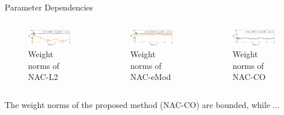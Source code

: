 \documentclass[8pt, aspectratio=169]{beamer}
\begin{document}
\begin{frame}{Parameter Dependencies}

  \begin{columns}

      \begin{figure}      
        \includegraphics[width=0.99\textwidth]{figures/ECC/fig9.eps}
        \caption{Weight norms of NAC-L2}
      \end{figure}
      

      \begin{figure}
        \includegraphics[width=0.99\textwidth]{figures/ECC/fig10.eps}
        \caption{Weight norms of NAC-eMod}
      \end{figure}


      \begin{figure}
        \includegraphics[width=0.99\textwidth]{figures/ECC/fig8.eps}
        \caption{Weight norms of NAC-CO}
      \end{figure}
    
  \end{columns}

  The weight norms of the proposed method (NAC-CO) are bounded, while ...

\end{frame}
\end{document}
